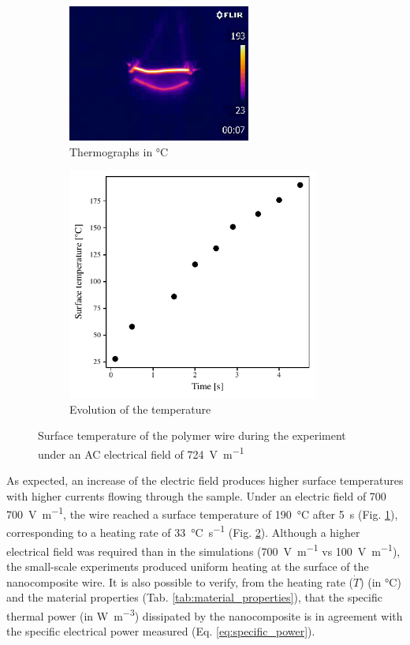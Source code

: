 \documentclass[11pt,review,times]{elsarticle}
\begin{document}
\begin{figure}[htb]
	\center
	\captionsetup{width=125mm}
	\begin{subfigure}{60mm}
		\center
		\captionsetup{width=60mm}
		\includegraphics[width=60mm]{output0036}
		\caption{Thermographs in \si{\celsius}}
		\label{fig:results_thermal}
	\end{subfigure}
	\begin{subfigure}{80mm}
		\center
		\captionsetup{width=78mm}
		\includegraphics[width=3.25in]{temperature_over_time.pdf}
		\caption{Evolution of the temperature}
		\label{fig:temp_over_time}
	\end{subfigure}%
	\caption{Surface temperature of the polymer wire during the experiment under an AC electrical field of \SI{724}{\volt\per\metre}}
	\label{fig:results_lab}
\end{figure}


As expected, an increase of the electric field produces higher surface temperatures with higher currents flowing through the sample. 
Under an electric field of 700 \SI{700}{\V\per\m}, the wire reached a surface temperature of \SI{190}{\celsius} after \SI{5}{\s} (Fig. \ref{fig:results_thermal}), corresponding to a heating rate of \SI{33}{\celsius\per\s} (Fig. \ref{fig:temp_over_time}). 
Although a higher electrical field was required than in the simulations (\SI{700}{\V\per\m} vs \SI{100}{\V\per\m}), the small-scale experiments produced uniform heating at the surface of the nanocomposite wire. 
It is also possible to verify, from the heating rate ($\dot{T}$) (in \si{\celsius}) and the material properties (Tab. \ref{tab:material_properties}), that the specific thermal power (in \si{\W\per\cubic\m}) dissipated by the nanocomposite is in agreement with the specific electrical power measured (Eq. \ref{eq:specific_power}).  
\end{document}
